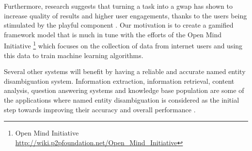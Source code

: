Furthermore, research suggests that turning a task into a \ac{gwap} has shown to increase quality of results and higher user engagements, thanks to the users being stimulated by the playful component \cite{41}. Our motivation is to create a gamified framework model that is much in tune with the efforts of the Open Mind Initiative \footnote{Open Mind Initiative \url{http://wiki.p2pfoundation.net/Open_Mind_Initiative}} \cite{5} which focuses on the collection of data from internet users and using this data to train machine learning algorithms. 

Several other systems will benefit by having a reliable and accurate named entity disambiguation system. Information extraction, information retrieval, content analysis, question answering systems and knowledge base population are some of the applications where named entity disambiguation is considered as the initial step towards improving their accuracy and overall performance \cite{16}.


